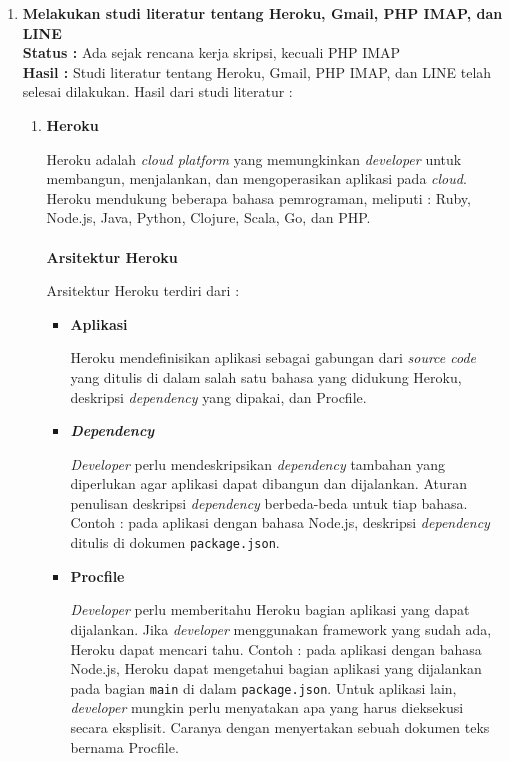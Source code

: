 \documentclass[a4paper,twoside]{article}
\begin{document}
\begin{enumerate}
	\item \textbf{Melakukan studi literatur tentang Heroku, Gmail, PHP IMAP, dan LINE}\\
	{\bf Status :} Ada sejak rencana kerja skripsi, kecuali PHP IMAP\\
	{\bf Hasil :}
	Studi literatur tentang Heroku, Gmail, PHP IMAP, dan LINE telah selesai dilakukan. Hasil dari studi literatur :
	\begin{enumerate}
		\item \textbf{Heroku}
		
		Heroku adalah \textit{cloud platform} yang memungkinkan \textit{developer} untuk membangun, menjalankan, dan mengoperasikan aplikasi pada \textit{cloud}. Heroku mendukung beberapa bahasa pemrograman, meliputi : Ruby, Node.js, Java, Python, Clojure, Scala, Go, dan PHP.
		\\
		\\
		\textbf{Arsitektur Heroku}
		
			Arsitektur Heroku terdiri dari :
			\begin{itemize}
				\item \textbf{Aplikasi}
				
				Heroku mendefinisikan aplikasi sebagai gabungan dari \textit{source code} yang ditulis di dalam salah satu bahasa yang didukung Heroku, deskripsi \textit{dependency} yang dipakai, dan Procfile.
		
				\item \textbf{\textit{Dependency}}
		
				\textit{Developer} perlu mendeskripsikan \textit{dependency} tambahan yang diperlukan agar aplikasi dapat dibangun dan dijalankan. Aturan penulisan deskripsi \textit{dependency} berbeda-beda untuk tiap bahasa. Contoh : pada aplikasi dengan bahasa Node.js, deskripsi \textit{dependency} ditulis di dokumen \texttt{package.json}.
		
				\item \textbf{Procfile}
		
				\textit{Developer} perlu memberitahu Heroku bagian aplikasi yang dapat dijalankan. Jika \textit{developer} menggunakan framework yang sudah ada, Heroku dapat mencari tahu. Contoh : pada aplikasi dengan bahasa Node.js, Heroku dapat mengetahui bagian aplikasi yang dijalankan pada bagian \texttt{main} di dalam \texttt{package.json}. Untuk aplikasi lain, \textit{developer} mungkin perlu menyatakan apa yang harus dieksekusi secara eksplisit. Caranya dengan menyertakan sebuah dokumen teks bernama Procfile. 


\end{itemize}
\end{enumerate}
\end{enumerate}
\end{document}

